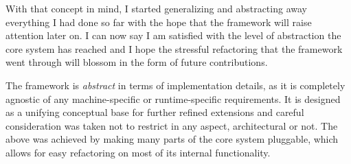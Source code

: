 \documentclass{dithesis}
\begin{document}
With that concept in mind, I started generalizing and abstracting away everything I had done so far with the hope that the framework will raise attention later on. I can now say I am satisfied with the level of abstraction the core system has reached and I hope the stressful refactoring that the framework went through will blossom in the form of future contributions.


The framework is \textit{abstract} in terms of implementation details, as it is completely agnostic of any machine-specific or runtime-specific requirements. It is designed as a unifying conceptual base for further refined extensions and careful consideration was taken not to restrict in any aspect, architectural or not. The above was achieved by making many parts of the core system pluggable, which allows for easy refactoring on most of its internal functionality.
















\end{document}
